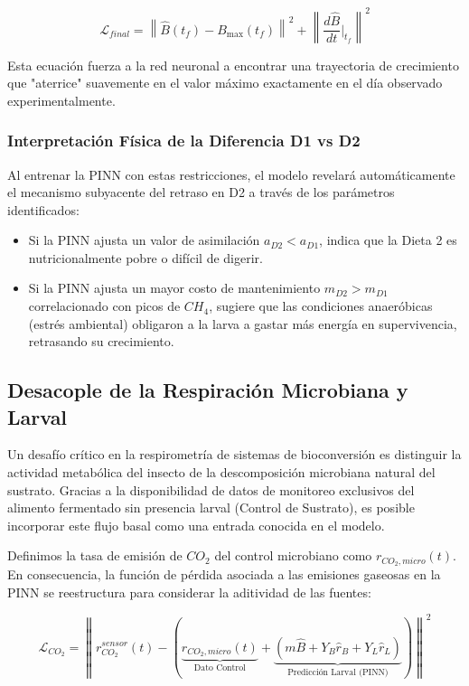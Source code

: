 \begin{equation}
\mathcal{L}_{final} = \left\| \hat{B}(t_f) - B_{\max}(t_f) \right\|^2 + \left\| \frac{d\hat{B}}{dt}\bigg|_{t_f} \right\|^2
\end{equation}

Esta ecuación fuerza a la red neuronal a encontrar una trayectoria de crecimiento que "aterrice" suavemente en el valor máximo exactamente en el día observado experimentalmente.

\subsubsection{Interpretación Física de la Diferencia D1 vs D2}
Al entrenar la PINN con estas restricciones, el modelo revelará automáticamente el mecanismo subyacente del retraso en D2 a través de los parámetros identificados:
\begin{itemize}
    \item Si la PINN ajusta un valor de asimilación $a_{D2} < a_{D1}$, indica que la Dieta 2 es nutricionalmente pobre o difícil de digerir.
    \item Si la PINN ajusta un mayor costo de mantenimiento $m_{D2} > m_{D1}$ correlacionado con picos de $CH_4$, sugiere que las condiciones anaeróbicas (estrés ambiental) obligaron a la larva a gastar más energía en supervivencia, retrasando su crecimiento.
\end{itemize}

\subsection{Desacople de la Respiración Microbiana y Larval}

Un desafío crítico en la respirometría de sistemas de bioconversión es distinguir la actividad metabólica 
del insecto de la descomposición microbiana natural del sustrato. Gracias a la disponibilidad de datos 
de monitoreo exclusivos del alimento fermentado sin presencia larval (Control de Sustrato), es posible 
incorporar este flujo basal como una entrada conocida en el modelo.

Definimos la tasa de emisión de $CO_2$ del control microbiano como $r_{CO_2, micro}(t)$. 
En consecuencia, la función de pérdida asociada a las emisiones gaseosas en la PINN se reestructura 
para considerar la aditividad de las fuentes:

\begin{equation}
\mathcal{L}_{CO_2} = \left\| r_{CO_2}^{sensor}(t) - \left( \underbrace{r_{CO_2, micro}(t)}_{\text{Dato Control}} + \underbrace{\left( m\hat{B} + Y_B \hat{r}_B + Y_L \hat{r}_L \right)}_{\text{Predicción Larval (PINN)}} \right) \right\|^2
\end{equation}

